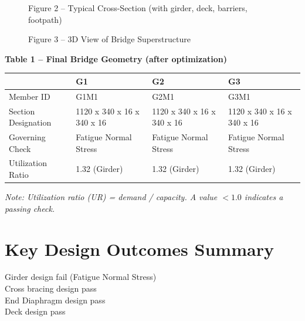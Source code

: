 \documentclass[12pt,a4paper]{report}
\numberwithin{table}{chapter}
\numberwithin{figure}{chapter}
\begin{document}
\newpage

\begin{figure}[H]
\centering
{}
\caption*{Figure 2 -- Typical Cross-Section (with girder, deck, barriers, footpath)}
\end{figure}

\begin{figure}[H]
\centering
{}
\caption*{Figure 3 -- 3D View of Bridge Superstructure}
\end{figure}

\noindent\textbf{Table 1 -- Final Bridge Geometry (after optimization)}

\vspace{0.4em}
\noindent
\begin{tabular}{|C{2.8cm}|C{4.1cm}|C{4.1cm}|C{4.1cm}|}
\hline
  \textbf{} &
  \textbf{G1} &
  \textbf{G2} &
  \textbf{G3} \\
\hline
Member ID & G1M1 & G2M1 & G3M1 \\
\hline
Section Designation & 1120 x 340 x 16 x 340 x 16 & 1120 x 340 x 16 x 340 x 16 & 1120 x 340 x 16 x 340 x 16 \\
\hline
Governing Check & Fatigue Normal Stress & Fatigue Normal Stress & Fatigue Normal Stress \\
\hline
Utilization Ratio & 1.32 (Girder) & 1.32 (Girder) & 1.32 (Girder) \\
\hline
\end{tabular}

\vspace{0.4em}
\noindent\textit{Note: Utilization ratio (UR) = demand / capacity. A value $< 1.0$ indicates a passing check.}

\vspace{1em}

\section*{Key Design Outcomes Summary}
\label{sec:key-outcomes}

\noindent Girder design fail (Fatigue Normal Stress) \\
Cross bracing design pass \\
End Diaphragm design pass \\
Deck design pass
\end{document}
